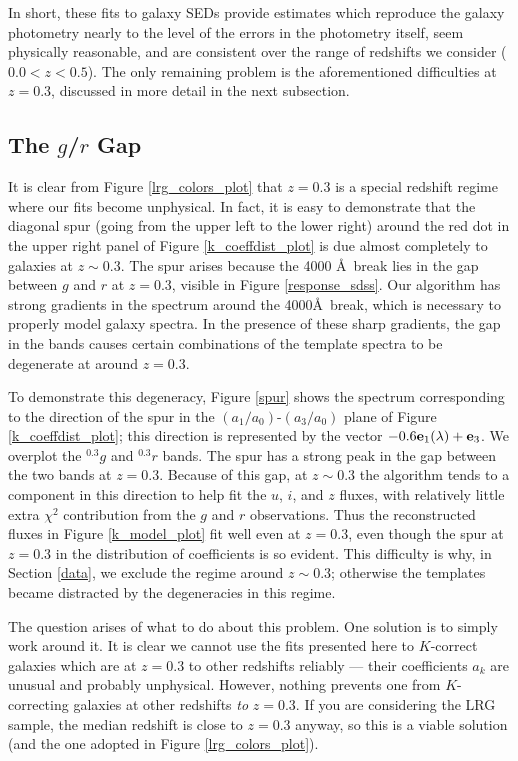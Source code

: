 \documentclass[10pt,preprint]{aastex}
\newcommand{\vv}[1]{{\bf #1}}
\newcommand{\band}[2]{\ensuremath{^{#1}\!{#2}}}
\begin{document}
In short, these fits to galaxy SEDs provide estimates which reproduce
the galaxy photometry nearly to the level of the errors in the
photometry itself, seem physically reasonable, and are consistent over
the range of redshifts we consider ($0.0 < z < 0.5$). The only
remaining problem is the aforementioned difficulties at $z=0.3$,
discussed in more detail in the next subsection.

\subsection{The $g$/$r$ Gap}
\label{grgap}

It is clear from Figure \ref{lrg_colors_plot} that $z=0.3$ is a
special redshift regime where our fits become unphysical. In fact, it
is easy to demonstrate that the diagonal spur (going from the upper
left to the lower right) around the red dot in the upper right panel
of Figure \ref{k_coeffdist_plot} is due almost completely to galaxies
at $z\sim 0.3$. The spur arises because the 4000 \AA\ break lies in
the gap between $g$ and $r$ at $z=0.3$, visible in Figure
\ref{response_sdss}. Our algorithm has strong gradients in the
spectrum around the 4000\AA\ break, which is necessary to properly
model galaxy spectra. In the presence of these sharp gradients, the
gap in the bands causes certain combinations of the template spectra
to be degenerate at around $z=0.3$.

To demonstrate this degeneracy, Figure \ref{spur} shows the spectrum
corresponding to the direction of the spur in the
$(a_1/a_0)$-$(a_3/a_0)$ plane of Figure \ref{k_coeffdist_plot}; this
direction is represented by the vector $-0.6 \vv{e}_1(\lambda) +
\vv{e}_3$. We overplot the \band{0.3}{g} and \band{0.3}{r} bands. The
spur has a strong peak in the gap between the two bands at
$z=0.3$. Because of this gap, at $z\sim 0.3$ the algorithm tends to a
component in this direction to help fit the $u$, $i$, and $z$ fluxes,
with relatively little extra $\chi^2$ contribution from the $g$ and
$r$ observations. Thus the reconstructed fluxes in Figure
\ref{k_model_plot} fit well even at $z=0.3$, even though the spur at
$z=0.3$ in the distribution of coefficients is so evident.  This
difficulty is why, in Section \ref{data}, we exclude the regime around
$z\sim 0.3$; otherwise the templates became distracted by the
degeneracies in this regime.

The question arises of what to do about this problem. One solution is
to simply work around it. It is clear we cannot use the fits presented
here to $K$-correct galaxies which are at $z=0.3$ to other redshifts
reliably --- their coefficients $a_k$ are unusual and probably
unphysical. However, nothing prevents one from $K$-correcting galaxies
at other redshifts {\it to} $z=0.3$. If you are considering the LRG
sample, the median redshift is close to $z=0.3$ anyway, so this is a
viable solution (and the one adopted in Figure \ref{lrg_colors_plot}).
\end{document}
